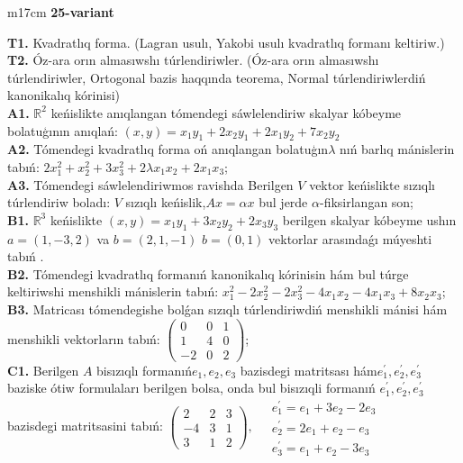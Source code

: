 \documentclass{article}
\begin{document}
\begin{tabular}{m{17cm}}
\textbf{25-variant}
\newline

\textbf{T1.} Kvadratlıq forma. (Lagran usulı, Yakobi usulı kvadratlıq formanı keltiriw.) \\
\textbf{T2.} Óz-ara orın almasıwshı túrlendiriwler. (Óz-ara orın almasıwshı túrlendiriwler,  Ortogonal bazis haqqında teorema,  Normal túrlendiriwlerdiń kanonikalıq kórinisi) \\
\textbf{A1.} \(\mathbb{R}^{2}\) keńislikte anıqlangan tómendegi sáwlelendiriw skalyar kóbeyme bolatuģının anıqlań: \((x,y) = x_{1}y_{1} + 2x_{2}y_{1} + 2x_{1}y_{2} + 7x_{2}y_{2}\) \\
\textbf{A2.} Tómendegi kvadratlıq forma oń anıqlangan bolatuģın\(\lambda\) nıń barlıq mánislerin tabıń: \(2x_{1}^{2} + x_{2}^{2} + 3x_{3}^{2} + 2\lambda x_{1}x_{2} + 2x_{1}x_{3}\); \\
\textbf{A3.} Tómendegi sáwlelendiriwmos ravishda Berilgen \(V\) vektor keńislikte sızıqlı túrlendiriw boladı: \(V\) sızıqlı keńislik,\(Ax = \alpha x\) bul jerde \(\alpha\)-fiksirlangan son; \\
\textbf{B1.} \(\mathbb{R}^{3}\) keńislikte \((x,y) = x_{1}y_{1} + 3x_{2}y_{2} + 2x_{3}y_{3}\) berilgen skalyar kóbeyme ushın \(a = (1, - 3,2)\) va \(b = (2,1, - 1)\) \(b = (0,1)\) vektorlar arasındaǵı múyeshti tabıń . \\
\textbf{B2.} Tómendegi kvadratlıq formanıń kanonikalıq kórinisin hám bul túrge keltiriwshi menshikli mánislerin tabıń: \(x_{1}^{2} - 2x_{2}^{2} - 2x_{3}^{2} - 4x_{1}x_{2} - 4x_{1}x_{3} + 8x_{2}x_{3}\); \\
\textbf{B3.} Matricası tómendegishe bolǵan sızıqlı túrlendiriwdiń menshikli mánisi hám menshikli vektorların tabıń: \(\begin{pmatrix} 0 & 0 & 1 \\ 1 & 4 & 0 \\  - 2 & 0 & 2 \end{pmatrix}\); \\
\textbf{C1.} Berilgen \(A\) bisızıqlı formanıń\(e_{1},e_{2},e_{3}\) bazisdegi matritsası hám\(e_{1}^{'},e_{2}^{'},e_{3}^{'}\) baziske ótiw formulaları berilgen bolsa, onda bul bisızıqli formanıń \(e_{1}^{'},e_{2}^{'},e_{3}^{'}\) bazisdegi matritsasini tabıń: \(\begin{pmatrix} 2 & 2 & 3 \\  - 4 & 3 & 1 \\ 3 & 1 & 2 \end{pmatrix},\ \begin{matrix}  & e_{1}^{'} = e_{1} + 3e_{2} - 2e_{3} \\  & e_{2}^{'} = 2e_{1} + e_{2} - e_{3} \\  & e_{3}^{'} = e_{1} + e_{2} - 3e_{3} \end{matrix}\) \\

\end{tabular}
\end{document}
